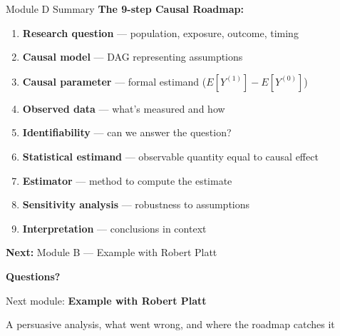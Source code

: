 \documentclass[aspectratio=169]{beamer}
\begin{document}
\begin{frame}{Module D Summary}
  \small
  \textbf{The 9-step Causal Roadmap:}
  \vspace{0.3em}

  \begin{enumerate}
    \item \textbf{Research question} --- population, exposure, outcome, timing
    \item \textbf{Causal model} --- DAG representing assumptions
    \item \textbf{Causal parameter} --- formal estimand ($E[Y^{(1)}] - E[Y^{(0)}]$)
    \item \textbf{Observed data} --- what's measured and how
    \item \textbf{Identifiability} --- can we answer the question?
    \item \textbf{Statistical estimand} --- observable quantity equal to causal effect
    \item \textbf{Estimator} --- method to compute the estimate
    \item \textbf{Sensitivity analysis} --- robustness to assumptions
    \item \textbf{Interpretation} --- conclusions in context
  \end{enumerate}
  \vspace{0.3em}

  \textcolor{accent}{\textbf{Next:}} Module B --- Example with Robert Platt
\end{frame}

\begin{frame}{}
  \vfill
  \centering
  \Large
  \textbf{Questions?}

  \vspace{2em}

  \normalsize
  Next module: \textbf{Example with Robert Platt}

  \vspace{1em}

  \small
  A persuasive analysis, what went wrong, and where the roadmap catches it
  \vfill
\end{frame}
\end{document}
